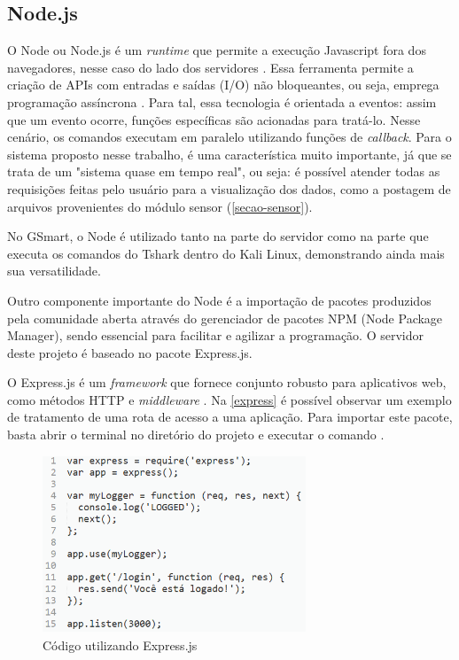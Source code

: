 \subsection{Node.js}
O Node ou Node.js é um \emph{runtime} que permite a execução Javascript fora dos navegadores, nesse caso do lado dos servidores \cite{node}.
Essa ferramenta permite a criação de APIs com entradas e saídas (I/O) não bloqueantes, ou seja, emprega programação assíncrona \cite{Dzone}. Para tal, essa tecnologia é orientada a eventos: assim que um evento ocorre, funções específicas são acionadas para tratá-lo. Nesse cenário, os comandos executam em paralelo utilizando funções de \emph{callback}. Para o sistema proposto nesse trabalho, é uma característica muito importante, já que se trata de um "sistema quase em tempo real", ou seja: é possível atender todas as requisições feitas pelo usuário para a visualização dos dados, como
a postagem de arquivos provenientes do módulo sensor (\autoref{secao-sensor}).

No GSmart, o Node é utilizado tanto na parte do servidor como na parte que executa os comandos do Tshark dentro do Kali Linux, demonstrando ainda mais sua versatilidade.

Outro componente importante do Node é a importação de pacotes produzidos pela comunidade aberta através do gerenciador de pacotes NPM (Node
Package Manager), sendo essencial para facilitar e agilizar a programação. O servidor deste projeto é baseado no pacote Express.js.

O Express.js é um \emph{framework} que fornece conjunto robusto para aplicativos
web, como métodos HTTP e \emph{middleware} \cite{express}. Na \autoref{express} é
possível observar um exemplo de tratamento de uma rota de acesso a uma aplicação.
Para importar este pacote, basta abrir o terminal no diretório do projeto e executar o comando
.

\begin{figure}[htb]
  \caption{\label{express}Código utilizando Express.js}
  \begin{center}
    \includegraphics[width=0.70\textwidth]{img/express.png}
  \end{center}
\end{figure}

